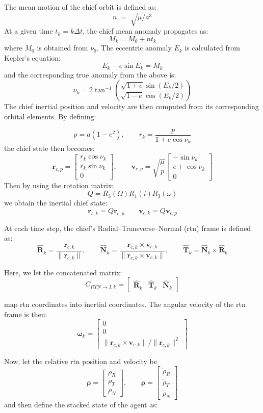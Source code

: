 The mean motion of the chief orbit is defined as:
\[
n \;=\; \sqrt{\mu/a^3}
\]
At a given time $t_k = k\Delta t$, the chief mean anomaly propagates as:
\[
M_k = M_0 + nt_k
\]
where $M_0$ is obtained from $\nu_0$. The eccentric anomaly $E_k$ is calculated from Kepler's equation:
\[
E_k - e\sin E_k = M_k
\]
and the corresponding true anomaly from the above is:
\[
\nu_k
=
2 \tan^{-1}
\left(
\frac{\sqrt{1+e}\sin(E_k/2)}
     {\sqrt{1-e}\cos(E_k/2)}
\right)
\]
The chief inertial position and velocity are then computed from its corresponding orbital elements. By defining:


\[
p = a(1-e^2),
\qquad
r_k = \frac{p}{1+e\cos\nu_k}
\]
the chief state then becomes:
\[
\mathbf{r}_{c,p}
=
\begin{bmatrix}
r_k\cos\nu_k\\
r_k\sin\nu_k\\
0
\end{bmatrix},
\qquad
\mathbf{v}_{c,p}
=
\sqrt{\frac{\mu}{p}}
\begin{bmatrix}
-\sin\nu_k\\
e+\cos\nu_k\\
0
\end{bmatrix}
\]
Then by using the rotation matrix:
\[
Q = R_3(\Omega)R_1(i)R_3(\omega)
\]
we obtain the inertial chief state:
\[
\mathbf{r}_{c,k} = Q\mathbf{r}_{c,p}
\qquad
\mathbf{v}_{c,k} = Q\mathbf{v}_{c,p}
\]

At each time step, the chief's Radial--Transverse--Normal (\acs{rtn}) frame is defined as:
\[
\hat{\mathbf{R}}_k = \frac{\mathbf{r}_{c,k}}{\|\mathbf{r}_{c,k}\|},
\qquad
\hat{\mathbf{N}}_k =
\frac{\mathbf{r}_{c,k}\times \mathbf{v}_{c,k}}
     {\|\mathbf{r}_{c,k}\times \mathbf{v}_{c,k}\|},
\qquad
\hat{\mathbf{T}}_k = \hat{\mathbf{N}}_k \times \hat{\mathbf{R}}_k
\]

Here, we let the concatenated matrix:
\[
C_{RTN\to I,k}
=
\begin{bmatrix}
\hat{\mathbf{R}}_k & \hat{\mathbf{T}}_k & \hat{\mathbf{N}}_k
\end{bmatrix}
\]

map \acs{rtn} coordinates into inertial coordinates. The angular velocity of the \acs{rtn} frame is then:
\[
\boldsymbol{\omega}_k =
\begin{bmatrix}
0\\
0\\
\|\mathbf{r}_{c,k}\times \mathbf{v}_{c,k}\|/\|\mathbf{r}_{c,k}\|^2
\end{bmatrix}
\]

Now, let the relative \acs{rtn} position and velocity be
\[
\boldsymbol{\rho} =
\begin{bmatrix}
\rho_R\\
\rho_T\\
\rho_N
\end{bmatrix},
\qquad
\dot{\boldsymbol{\rho}} =
\begin{bmatrix}
\dot{\rho}_R\\
\dot{\rho}_T\\
\dot{\rho}_N
\end{bmatrix}
\]
and then define the stacked state of the agent as:

